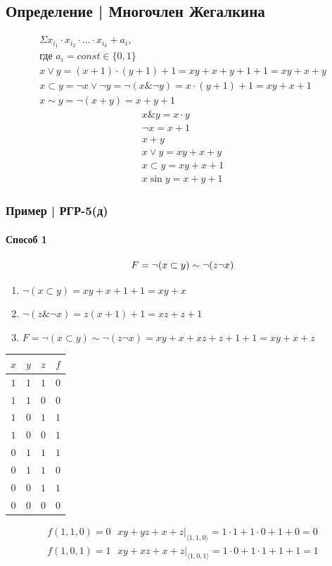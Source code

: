 \documentclass{article}
\begin{document}
\subsection{Определение | Многочлен Жегалкина}
\begin{gather*}
    \Sigma x_{i_1} \cdot x_{i_2} \cdot \dots \cdot x_{i_k} + a_i, \\
    \text{где } a_i = const \in \{0, 1\} \\
    x \vee y = (x + 1) \cdot (y + 1) + 1 =
    xy + x + y + 1 + 1 = xy + x + y \\
    x \subset y = \neg x \vee \neg y = 
    \neg(x \& \neg y) =
    x \cdot (y + 1) + 1 = xy + x + 1 \\
    x \sim y = \neg(x + y) = x + y + 1
\end{gather*}
\begin{gather*}
    x \& y = x \cdot y \\
    \neg x = x + 1 \\
    x + y \\
    x \vee y = xy + x + y \\
    x \subset y = xy + x + 1 \\
    x \sin y = x + y + 1
\end{gather*}

\subsubsection{Пример | РГР-5(д)}
\paragraph{Способ 1}
\[
    F = \neg(x \subset y) \sim \neg(z \neg x) \\
\]
\begin{enumerate}
    \item $\neg(x \subset y) = xy + x + 1 + 1 = xy + x$
    \item $\neg(z \& \neg x) = z(x + 1) + 1 = xz + z + 1$
    \item $F = \neg(x \subset y) \sim \neg(z \neg x) = xy + x + xz + z + 1 + 1 = xy + x + z$
\end{enumerate}
\begin{tabular}{c|c|c|c}
    $x$ & $y$ & $z$ & $f$ \\
    \hline
    $1$ & $1$ & $1$ & $0$ \\
    $1$ & $1$ & $0$ & $0$ \\
    $1$ & $0$ & $1$ & $1$ \\
    $1$ & $0$ & $0$ & $1$ \\
    $0$ & $1$ & $1$ & $1$ \\
    $0$ & $1$ & $1$ & $0$ \\
    $0$ & $0$ & $1$ & $1$ \\
    $0$ & $0$ & $0$ & $0$
\end{tabular}
\begin{gather*}
    f(1, 1, 0) = 0 ~~~ xy + yz + x + z \big|_{\langle 1, 1, 0 \rangle} = 1 \cdot 1 + 1 \cdot 0 + 1 + 0 = 0 \\
    f(1, 0, 1) = 1 ~~~ xy + xz + x + z \big|_{\langle 1, 0, 1 \rangle} = 1 \cdot 0 + 1 \cdot 1 + 1 + 1 = 1
\end{gather*}
\end{document}
